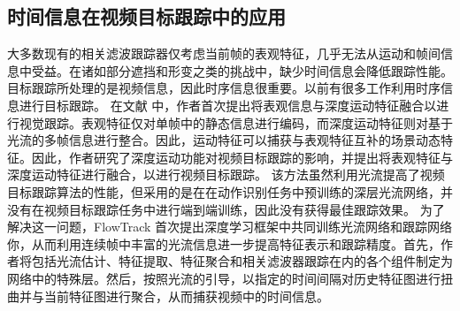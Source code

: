 \subsection{时间信息在视频目标跟踪中的应用}
大多数现有的相关滤波跟踪器仅考虑当前帧的表观特征，几乎无法从运动和帧间信息中受益。在诸如部分遮挡和形变之类的挑战中，缺少时间信息会降低跟踪性能。目标跟踪所处理的是视频信息，因此时序信息很重要。以前有很多工作利用时序信息进行目标跟踪。
在文献 \cite{DeepMotion} 中，作者首次提出将表观信息与深度运动特征融合以进行视觉跟踪。表观特征仅对单帧中的静态信息进行编码，而深度运动特征则对基于光流的多帧信息进行整合。因此，运动特征可以捕获与表观特征互补的场景动态特征。因此，作者研究了深度运动功能对视频目标跟踪的影响，并提出将表观特征与深度运动特征进行融合，以进行视频目标跟踪。
该方法虽然利用光流提高了视频目标跟踪算法的性能，但采用的是在在动作识别任务中预训练的深层光流网络，并没有在视频目标跟踪任务中进行端到端训练，因此没有获得最佳跟踪效果。
为了解决这一问题，FlowTrack \cite{FlowTrack} 首次提出深度学习框架中共同训练光流网络和跟踪网络你，从而利用连续帧中丰富的光流信息进一步提高特征表示和跟踪精度。首先，作者将包括光流估计、特征提取、特征聚合和相关滤波器跟踪在内的各个组件制定为网络中的特殊层。然后，按照光流的引导，以指定的时间间隔对历史特征图进行扭曲并与当前特征图进行聚合，从而捕获视频中的时间信息。

